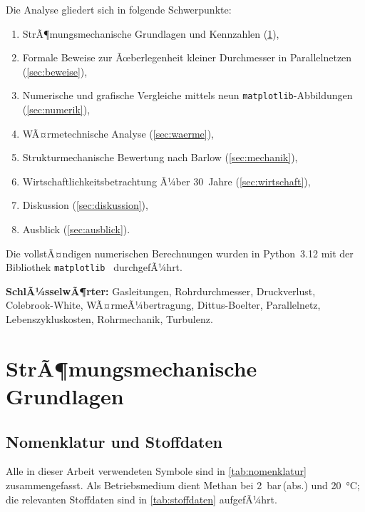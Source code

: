 ﻿\documentclass[12pt,a4paper,twoside]{article}
\theoremstyle{plain}
\theoremstyle{definition}
\theoremstyle{remark}
\begin{document}
Die Analyse gliedert sich in folgende Schwerpunkte:
\begin{enumerate}[label=(\roman*)]
  \item StrÃ¶mungsmechanische Grundlagen und Kennzahlen (\cref{sec:grundlagen}),
  \item Formale Beweise zur Ãœberlegenheit kleiner Durchmesser in Parallelnetzen
        (\cref{sec:beweise}),
  \item Numerische und grafische Vergleiche mittels neun \texttt{matplotlib}-Abbildungen
        (\cref{sec:numerik}),
  \item WÃ¤rmetechnische Analyse (\cref{sec:waerme}),
  \item Strukturmechanische Bewertung nach Barlow (\cref{sec:mechanik}),
  \item Wirtschaftlichkeitsbetrachtung Ã¼ber 30~Jahre (\cref{sec:wirtschaft}),
  \item Diskussion (\cref{sec:diskussion}),
  \item Ausblick (\cref{sec:ausblick}).
\end{enumerate}

\bigskip
\noindent
Die vollstÃ¤ndigen numerischen Berechnungen wurden in Python~3.12 mit der
Bibliothek \texttt{matplotlib}~\cite{Hunter2007} durchgefÃ¼hrt.

\noindent\textbf{SchlÃ¼sselwÃ¶rter:} Gasleitungen, Rohrdurchmesser, Druckverlust, Colebrook-White, WÃ¤rmeÃ¼bertragung, Dittus-Boelter, Parallelnetz, Lebenszykluskosten, Rohrmechanik, Turbulenz.


\section{StrÃ¶mungsmechanische Grundlagen}
\label{sec:grundlagen}

\subsection{Nomenklatur und Stoffdaten}
\label{ssec:nomenklatur}

Alle in dieser Arbeit verwendeten Symbole sind in \cref{tab:nomenklatur}
zusammengefasst.
Als Betriebsmedium dient Methan bei \SI{2}{\bar}\,(abs.) und \SI{20}{\celsius};
die relevanten Stoffdaten sind in \cref{tab:stoffdaten} aufgefÃ¼hrt.
\end{document}
